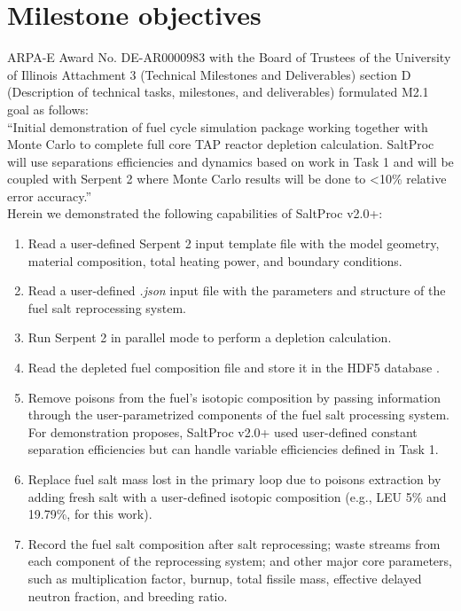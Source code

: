 \documentclass[12pt]{article} %
\begin{document}
\section{Milestone objectives}
ARPA-E Award No. DE-AR0000983 with the Board of Trustees of the University of Illinois Attachment 3 (Technical Milestones and Deliverables) section D (Description of 
technical tasks, milestones, and deliverables) formulated M2.1 goal as follows: \\
``Initial demonstration of fuel cycle simulation package working together with 
Monte Carlo to complete full core TAP reactor depletion calculation. SaltProc 
will use separations efficiencies and dynamics based on work in Task 1 and will 
be coupled with Serpent 2 where Monte Carlo results will be done to <10\% 
relative error accuracy.'' \\ Herein we demonstrated the following 
capabilities of SaltProc v2.0+:
\begin{enumerate}
	\item Read a user-defined Serpent 2 input template file with the model geometry, 
	material composition, total heating power, and boundary conditions.
	\item Read a user-defined \emph{.json} input file with the parameters and 
	structure of the fuel salt reprocessing system.
	\item Run Serpent 2 in parallel mode to perform a depletion calculation.
	\item Read the depleted fuel composition file and store it in the HDF5 
	database \cite{the_hdf_group_hierarchical_1997}.
	\item Remove poisons from the fuel's isotopic composition by passing 
	information	through the user-parametrized components of the fuel salt 
	processing system. For demonstration proposes, SaltProc v2.0+ used 
	user-defined constant 	separation efficiencies but can handle variable 
	efficiencies defined in Task 1.
	\item Replace fuel salt mass lost in the primary loop due to poisons 
	extraction by adding fresh salt with a user-defined isotopic composition 
	(e.g., \gls{LEU} 5\% and 19.79\%, for this work).
	\item Record the fuel salt composition after salt reprocessing; waste 
	streams from each component of the reprocessing system; and other major 
	core parameters, such as multiplication factor, burnup, total fissile 
	mass, effective delayed neutron fraction, and breeding ratio.	
\end{enumerate}
\end{document}
